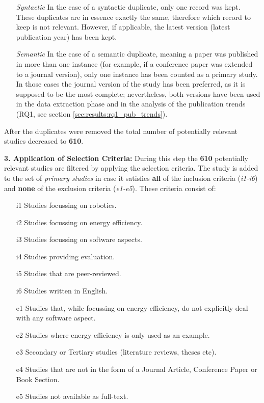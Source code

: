 \vspace{1mm}

\begin{enumerate}
    \item[\textit{Syntactic}] In the case of a syntactic duplicate, only one record was kept. 
    These duplicates are in essence exactly the same, therefore which record to keep is not relevant.
    However, if applicable, the latest version (latest publication year) has been kept.

    \item[\textit{Semantic}] In the case of a semantic duplicate, meaning a paper was published in more than one instance 
    (for example, if a conference paper was extended to a journal version), only one instance has been counted as a primary study. 
    In those cases the journal version of the study has been preferred, as it is supposed to be the most complete; nevertheless, 
    both versions have been used in the data extraction phase and in the analysis of the publication trends (RQ1, see section \ref{sec:results:rq1_pub_trends}).

\end{enumerate}
After the duplicates were removed the total number of potentially relevant studies decreased to \textbf{610}.

\vspace{5mm}

\noindent\textbf{3. Application of Selection Criteria:}
During this step the \textbf{610} potentially relevant studies are filtered by applying the selection criteria. 
The study is added to the set of \textit{primary studies} in case it satisfies \textbf{all} of the inclusion criteria (\textit{i1-i6}) 
and \textbf{none} of the exclusion criteria (\textit{e1-e5}). 
These criteria consist of:
\begin{itemize}
    \item[i1] Studies focussing on robotics.
	\item[i2] Studies focussing on energy efficiency.
    \item[i3] Studies focussing on software aspects.
    \item[i4] Studies providing evaluation.
    \item[i5] Studies that are peer-reviewed.
    \item[i6] Studies written in English.
    
	\item[e1] Studies that, while focussing on energy efficiency, do not explicitly deal with any software aspect.
    \item[e2] Studies where energy efficiency is only used as an example.
    \item[e3] Secondary or Tertiary studies (literature reviews, theses etc).
    \item[e4] Studies that are not in the form of a Journal Article, Conference Paper or Book Section.
    \item[e5] Studies not available as full-text.
\end{itemize}

